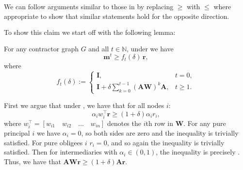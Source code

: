 \documentclass[mnsc,nonblindrev]{informs3}
\newcommand{\din}{\delta_{\text{in}}}
\newcommand{\Xvec}{\mathbf{X}}
\newcommand{\rvec}{\mathbf{r}}
\newcommand{\A}{\mathbf{A}}
\newcommand{\W}{\mathbf{W}}
\newcommand{\I}{\mathbf{I}}
\newcommand{\mean}{m}
\newcommand{\meanvec}{\mathbf{\mean}}
\let\originalleft\left
\let\originalright\right
\renewcommand{\left}{\mathopen{}\mathclose\bgroup\originalleft}
\renewcommand{\right}{\aftergroup\egroup\originalright}
\renewenvironment{proof}[1][Proof]{%
  \par\noindent{\itshape #1.} \ignorespaces
}{%
  \hfill\Halmos\par
}
\begin{document}
\begin{APPENDICES}
\begin{proof}
    We can follow arguments similar to those in  by replacing $\geq$ with $\leq$ where appropriate to show that similar statements hold for the opposite direction.
\end{proof}





\MeanFieldGap*
\begin{proof}
To show this claim we start off with the following lemma:


\begin{lemma}
\label{lem:mean_risk_increase}
For any contractor graph $G$ and all $t \in \mathbb{N}$, under  we have
\[
    \meanvec^t \geq f_t(\delta)\,\rvec,
\]
where
\[
    f_t(\delta) :=
    \begin{cases}
        \I, & t=0, \\[6pt]
        \I + \delta \sum_{k=0}^{t-1} (\A\W)^k \A, & t \geq 1.
    \end{cases}
\]
\end{lemma}
\begin{proof}
First we argue that under , we have that for all nodes $i$:
\[
\alpha_i w_i^\top \rvec \geq (1 + \delta) \alpha_i r_i,
\]
where $w_i^\top = [w_{i1}\quad w_{i2} \quad \dots \quad w_{in}]$ denotes the $i$th row in $\W$.
For any pure principal $i$ we have $\alpha_i = 0$, so both sides are zero and the inequality is trivially satisfied. For pure obligees $i$ $r_i = 0$, and so again the inequality is trivially satisfied. Then for intermediaries with $\alpha_i\in(0,1)$, the inequality is precisely .
Thus, we have that $\A \W \rvec \geq (1 + \delta) \A \rvec$.


\end{proof}
\end{proof}
\end{APPENDICES}
\end{document}
